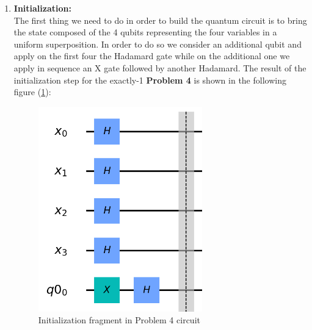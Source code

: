 \documentclass[english]{article}
\begin{document}
				\begin{enumerate}
					\item \textbf{Initialization:}\\
						The first thing we need to do in order to build the quantum circuit is to bring the state composed of the 4 qubits representing the four variables in a uniform superposition. In order to do so we consider an additional qubit and apply on the first four the Hadamard gate while on the additional one we apply in sequence an X gate followed by another Hadamard. The result of the initialization step for the exactly-1 \textbf{Problem 4} is shown in the following figure (\ref{fig:initializationCircuit}):
						\begin{figure}[h]
							\centering
							\includegraphics[scale=0.8]{Initialization_Circuit.png}
							\caption{
								\label{fig:initializationCircuit}
								Initialization fragment in Problem 4 circuit
							}
						\end{figure}
					

\end{enumerate}
\end{document}
